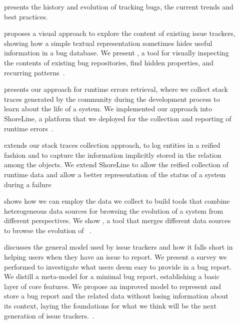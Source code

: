 \begin{description}
  \item[] presents the history and evolution of tracking bugs, the current trends and best practices.

  \item[] proposes a visual approach to explore the content of existing issue trackers, showing how a simple textual representation sometimes hides useful information in a bug database.
  We present \ib, a tool for visually inspecting the contents of existing bug repositories, find hidden properties, and recurring patterns~\cite{DalS2013a,DalS2014a}.

  \item[] presents our approach for runtime errors retrieval, where we collect stack traces generated by the community during the development process to learn about the life of a system.
  We implemented our approach into ShoreLine, a platform that we deployed for the collection and reporting of runtime errors~\cite{DalS2015a}.

  \item[] extends our stack traces collection approach, to log entities in a reified fashion and to capture the information implicitly stored in the relation among the objects.
  We extend ShoreLine to allow the reified collection of runtime data and allow a better representation of the status of a system during a failure~\cite{DalS2017b}

  \item[] shows how we can employ the data we collect to build tools that combine heterogeneous data sources for browsing the evolution of a system from different perspectives.
  We show \blend, a tool that merges different data sources to browse the evolution of \pha~\cite{DalS2015b}.

  \item[] discusses the general model used by issue trackers and how it falls short in helping users when they have an issue to report.
  We present a survey we performed to investigate what users deem easy to provide in a bug report.
  We distill a meta-model for a minimal bug report, establishing a basic layer of core features.
  We propose an improved model to represent and store a bug report and the related data without losing information about its context, laying the foundations for what we think will be the next generation of issue trackers.~\cite{DalS2016a}.


\end{description}

